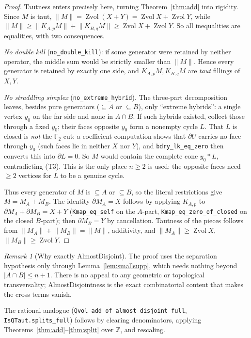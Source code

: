 \documentclass[11pt]{article}
\theoremstyle{plain}
\theoremstyle{definition}
\theoremstyle{remark}
\newtheorem*{remark}{Remark}
\newcommand{\Zvol}{\operatorname{Zvol}}
\newcommand{\bd}{\partial}
\newcommand{\F}{\mathbb{F}}
\newcommand{\Z}{\mathbb{Z}}
\newcommand{\code}[1]{\texttt{#1}}
\newcommand{\card}[1]{\lvert #1\rvert}
\newcommand{\norm}[1]{\lVert #1\rVert}
\begin{document}
\begin{proof}
Tautness enters precisely here, turning Theorem~\ref{thm:add} into rigidity. Since $M$ is
taut, $\norm{M}=\Zvol(X+Y)=\Zvol X+\Zvol Y$, while
$\norm{M}\ge\norm{K_{A,p}M}+\norm{K_{B,q}M}\ge\Zvol X+\Zvol Y$. So all inequalities are
equalities, with two consequences.

\emph{No double kill} (\code{no\_double\_kill}): if some generator were retained by neither
operator, the middle sum would be strictly smaller than $\norm M$. Hence every generator is
retained by exactly one side, and $K_{A,p}M,K_{B,q}M$ are \emph{taut} fillings of $X,Y$.

\emph{No straddling simplex} (\code{no\_extreme\_hybrid}). The three-part decomposition
leaves, besides pure generators ($\subseteq A$ or $\subseteq B$), only ``extreme hybrids'':
a single vertex $y_0$ on the far side and none in $A\cap B$. If such hybrids existed,
collect those through a fixed $y_0$; their faces opposite $y_0$ form a nonempty cycle $L$.
That $L$ is closed is \emph{not} the $\F_2$ cut: a coefficient computation shows that $\bd U$
carries no face through $y_0$ (such faces lie in neither $X$ nor $Y$), and \code{bdry\_lk\_eq\_zero}
then converts this into $\bd L=0$. So $M$ would contain the complete cone $y_0\ast L$,
contradicting (T3). This is the only place $n\ge 2$ is used:
the opposite faces need $\ge 2$ vertices for $L$ to be a genuine cycle.

Thus every generator of $M$ is $\subseteq A$ or $\subseteq B$, so the literal restrictions give
$M=M_A+M_B$. The identity $\bd M_A=X$ follows by applying $K_{A,p}$ to $\bd M_A+\bd M_B=X+Y$
(\code{Kmap\_eq\_self} on the $A$-part, \code{Kmap\_eq\_zero\_of\_closed} on the closed $B$-part);
then $\bd M_B=Y$ by cancellation. Tautness of the pieces follows from $\norm{M_A}+\norm{M_B}=\norm M$,
additivity, and $\norm{M_A}\ge\Zvol X$, $\norm{M_B}\ge\Zvol Y$.
\end{proof}

\begin{remark}[Why exactly AlmostDisjoint]
The proof uses the separation hypothesis only through Lemma~\ref{lem:smallsupp}, which needs
nothing beyond $\card{A\cap B}\le n+1$. There is no appeal to any geometric or topological
transversality; AlmostDisjointness is the exact combinatorial content that makes the cross
terms vanish.
\end{remark}

The rational analogue (\code{Qvol\_add\_of\_almost\_disjoint\_full},
\code{IsQTaut.splits\_full}) follows by clearing denominators, applying
Theorems~\ref{thm:add}--\ref{thm:split} over $\Z$, and rescaling.
\end{document}
